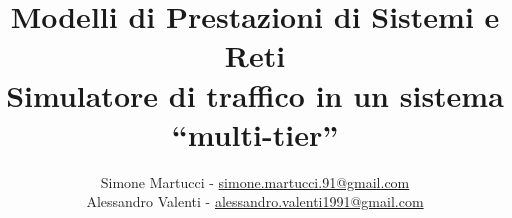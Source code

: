 \documentclass[12pt, a4paper, openany, twoside, titlepage]{book}
\begin{document}
 	\begin{titlepage}
 		\title{Modelli di Prestazioni di Sistemi  e Reti \\ \vspace{2 mm} {\large \bf{Simulatore di traffico in un sistema ``multi-tier''}}}
 		\author{Simone Martucci - \url{simone.martucci.91@gmail.com} \\ Alessandro Valenti - \url{alessandro.valenti1991@gmail.com} }
 		\date{}

 	\end{titlepage}

 	\maketitle

 	\frontmatter

 	\small




 	\tableofcontents
 	\label{Indice}

 	\normalsize

 	\mainmatter


 	\appendix
 
\end{document}
